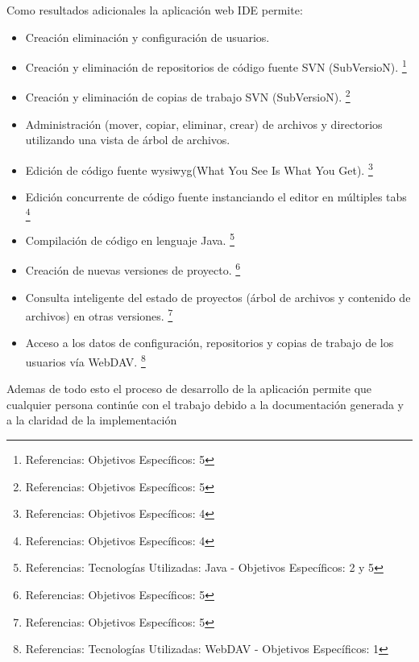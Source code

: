 Como resultados adicionales la aplicación web IDE permite:

\begin{itemize}
	
	\item Creación eliminación y configuración de usuarios.
	
	\item Creación y eliminación de repositorios de código fuente SVN (SubVersioN).
	\footnote {Referencias: Objetivos Específicos: 5}
	
	\item Creación y eliminación de copias de trabajo SVN (SubVersioN).
	\footnote {Referencias: Objetivos Específicos: 5}
	
	\item Administración (mover, copiar, eliminar, crear) de archivos y directorios utilizando una vista de árbol de archivos.
	
	\item Edición de código fuente wysiwyg(What You See Is What You Get).
	\footnote {Referencias: Objetivos Específicos: 4}
	
	\item Edición concurrente de código fuente instanciando el editor en múltiples tabs
	\footnote {Referencias: Objetivos Específicos: 4}
	
	\item Compilación de código en lenguaje Java.
	\footnote {Referencias: Tecnologías Utilizadas: Java - Objetivos Específicos: 2 y 5}
	
	\item Creación de nuevas versiones de proyecto.
	\footnote {Referencias: Objetivos Específicos: 5}
	
	\item Consulta inteligente del estado de proyectos (árbol de archivos y contenido de archivos) en otras versiones.
	\footnote {Referencias: Objetivos Específicos: 5}
	
	\item Acceso a los datos de configuración, repositorios y copias de trabajo de los usuarios vía WebDAV.
	\footnote {Referencias: Tecnologías Utilizadas: WebDAV - Objetivos Específicos: 1}
	
\end{itemize}

Ademas de todo esto el proceso de desarrollo de la aplicación permite que cualquier persona continúe con el trabajo debido a la documentación generada y a la claridad de la implementación


